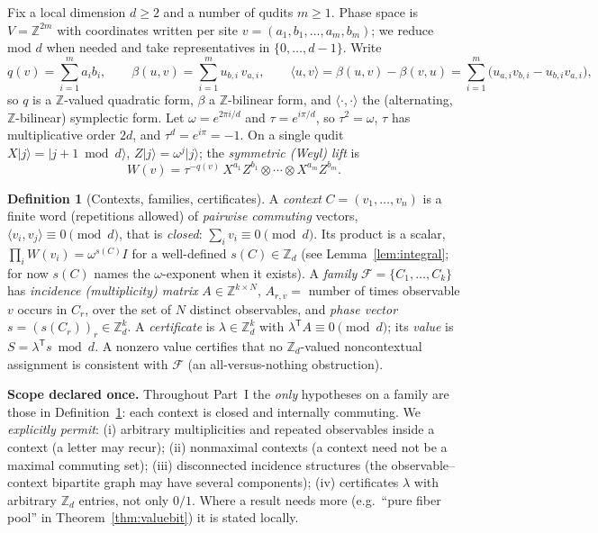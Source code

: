 \documentclass[11pt]{article}
\theoremstyle{definition}
\newtheorem{definition}[theorem]{Definition}
\theoremstyle{remark}
\newcommand{\Z}{\mathbb{Z}}
\newcommand{\Zd}{\Z_d}
\newcommand{\ip}[2]{\langle #1,#2\rangle}
\providecommand{\ket}[1]{\lvert #1\rangle}
\begin{document}
Fix a local dimension $d\ge2$ and a number of qudits $m\ge1$. Phase space is $V=\Z^{2m}$ with
coordinates written per site $v=(a_1,b_1,\dots,a_m,b_m)$; we reduce mod $d$ when needed and take
representatives in $\{0,\dots,d-1\}$. Write
\[
q(v)=\sum_{i=1}^m a_ib_i,\qquad
\beta(u,v)=\sum_{i=1}^m u_{b,i}\,v_{a,i},\qquad
\ip{u}{v}=\beta(u,v)-\beta(v,u)=\sum_{i=1}^m\bigl(u_{a,i}v_{b,i}-u_{b,i}v_{a,i}\bigr),
\]
so $q$ is a $\Z$-valued quadratic form, $\beta$ a $\Z$-bilinear form, and $\ip{\cdot}{\cdot}$ the
(alternating, $\Z$-bilinear) symplectic form. Let $\omega=e^{2\pi i/d}$ and $\tau=e^{i\pi/d}$, so
$\tau^2=\omega$, $\tau$ has multiplicative order $2d$, and $\tau^d=e^{i\pi}=-1$. On a single qudit
$X\ket{j}=\ket{j+1\bmod d}$, $Z\ket{j}=\omega^j\ket{j}$; the \emph{symmetric (Weyl) lift} is
\[
W(v)=\tau^{-q(v)}\,X^{a_1}Z^{b_1}\otimes\cdots\otimes X^{a_m}Z^{b_m}.
\]

\begin{definition}[Contexts, families, certificates]\label{def:ctx}
A \emph{context} $C=(v_1,\dots,v_n)$ is a finite word (repetitions allowed) of \emph{pairwise
commuting} vectors, $\ip{v_i}{v_j}\equiv0\pmod d$, that is \emph{closed}: $\sum_i v_i\equiv0\pmod d$.
Its product is a scalar, $\prod_iW(v_i)=\omega^{s(C)}I$ for a well-defined $s(C)\in\Zd$ (see
Lemma~\ref{lem:integral}; for now $s(C)$ names the $\omega$-exponent when it exists). A
\emph{family} $\mathcal F=\{C_1,\dots,C_k\}$ has \emph{incidence (multiplicity) matrix}
$A\in\Z^{k\times N}$, $A_{r,v}=$ number of times observable $v$ occurs in $C_r$, over the set of
$N$ distinct observables, and \emph{phase vector} $s=(s(C_r))_r\in\Zd^{k}$. A \emph{certificate} is
$\lambda\in\Zd^{k}$ with $\lambda^{\mathsf T}A\equiv0\pmod d$; its \emph{value} is
$S=\lambda^{\mathsf T}s\bmod d$. A nonzero value certifies that no $\Zd$-valued noncontextual
assignment is consistent with $\mathcal F$ (an all-versus-nothing obstruction).
\end{definition}

\noindent\textbf{Scope declared once.} Throughout Part~I the \emph{only} hypotheses on a family are
those in Definition~\ref{def:ctx}: each context is closed and internally commuting. We
\emph{explicitly permit}: (i) arbitrary multiplicities and repeated observables inside a context
(a letter may recur); (ii) nonmaximal contexts (a context need not be a maximal commuting set);
(iii) disconnected incidence structures (the observable--context bipartite graph may have several
components); (iv) certificates $\lambda$ with arbitrary $\Zd$ entries, not only $0/1$. Where a
result needs more (e.g.\ ``pure fiber pool'' in Theorem~\ref{thm:valuebit}) it is stated locally.
\end{document}

